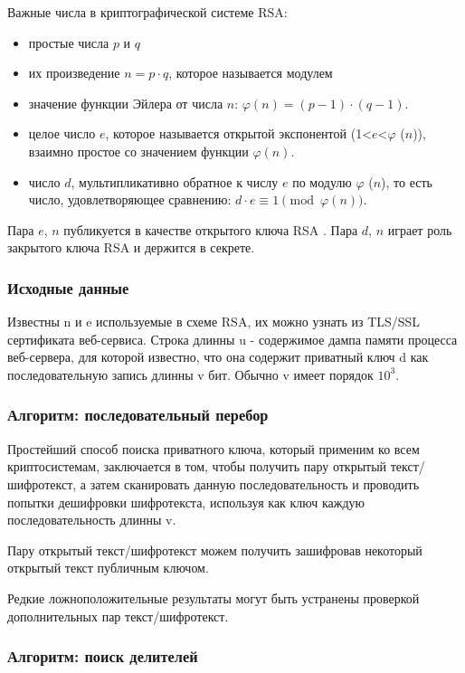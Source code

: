 \documentclass[20pt]{article}
\begin{document}
Важные числа в криптографической системе RSA:
\begin{itemize}
  \item простые числа $p$ и $q$
  \item их произведение $n=p \cdot q$, которое называется модулем
  \item значение функции Эйлера от числа $n$: $\varphi (n)=(p-1)\cdot (q-1)$.
  \item целое число $e$, которое называется открытой экспонентой
    (1<$e$<$\varphi$ ($n$)), взаимно простое со значением функции $\varphi(n)$.
  \item число $d$, мультипликативно обратное к числу $e$ по модулю
    $\varphi$ ($n$), то есть число, удовлетворяющее сравнению: $d\cdot e\equiv 1{\pmod {\varphi (n)}}$.
\end{itemize}

Пара {$e$, $n$} публикуется в качестве открытого ключа RSA .
Пара {$d$, $n$} играет роль закрытого ключа RSA и держится в секрете.

\subsubsection{Исходные данные}

Известны n и e используемые в схеме RSA, их можно узнать из TLS/SSL сертификата
веб-сервиса. Строка длинны u - содержимое дампа памяти процесса веб-сервера, для
которой известно, что она содержит приватный ключ d как последовательную запись
длинны v бит. Обычно v имеет порядок $10^3$.

\subsubsection{Алгоритм: последовательный перебор}

Простейший способ поиска приватного ключа, который применим ко всем
криптосистемам, заключается в том, чтобы получить пару открытый текст/шифротекст,
а затем сканировать данную последовательность и проводить попытки дешифровки
шифротекста, используя как ключ каждую последовательность длинны v.

Пару открытый текст/шифротекст можем получить зашифровав некоторый открытый текст
публичным ключом.

Редкие ложноположительные результаты могут быть устранены проверкой
дополнительных пар текст/шифротекст.

\subsubsection{Алгоритм: поиск делителей}
\end{document}
